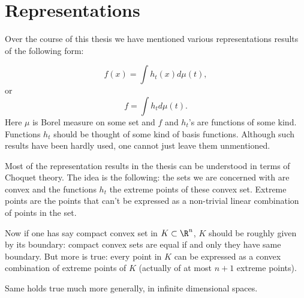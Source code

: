 \chapter{Representations}

Over the course of this thesis we have mentioned various representations results of the following form:

\[
f(x) = \int h_{t}(x) d \mu (t),
\]
or
\[
f = \int h_{t} d \mu(t).
\]
Here $\mu$ is Borel measure on some set and $f$ and $h_{t}$'s are functions of some kind. Functions $h_{t}$ should be thought of some kind of basis functions. Although such results have been hardly used, one cannot just leave them unmentioned.

Most of the representation results in the thesis can be understood in terms of Choquet theory. The idea is the following: the sets we are concerned with are convex and the functions $h_{t}$ the extreme points of these convex set. Extreme points are the points that can't be expressed as a non-trivial linear combination of points in the set.

Now if one has say compact convex set in $K \subset \R^{n}$, $K$ should be roughly given by its boundary: compact convex sets are equal if and only they have same boundary. But more is true: every point in $K$ can be expressed as a convex combination of extreme points of $K$ (actually of at most $n + 1$ extreme points).

Same holds true much more generally, in infinite dimensional spaces.